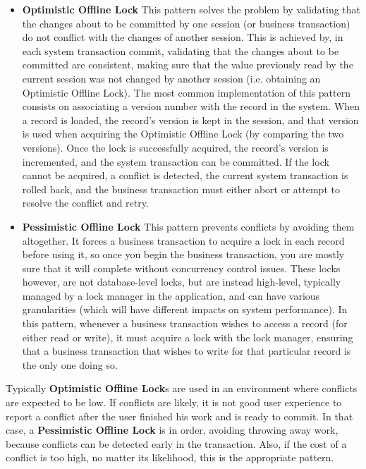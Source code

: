 \documentclass{llncs}
\begin{document}
\begin{itemize}
\item {\bf Optimistic Offline Lock} This pattern solves the problem by
  validating that the changes about to be committed by one session (or
  business transaction) do not conflict with the changes of another
  session. This is achieved by, in each system transaction commit,
  validating that the changes about to be committed are consistent,
  making sure that the value previously read by the current session
  was not changed by another session (i.e. obtaining an Optimistic
  Offline Lock).  The most common implementation of this pattern
  consists on associating a version number with the record in the
  system. When a record is loaded, the record's version is kept in the
  session, and that version is used when acquiring the Optimistic
  Offline Lock (by comparing the two versions). Once the lock is
  successfully acquired, the record's version is incremented, and the
  system transaction can be committed. If the lock cannot be acquired,
  a conflict is detected, the current system transaction is rolled
  back, and the business transaction must either abort or attempt to
  resolve the conflict and retry.

\item {\bf Pessimistic Offline Lock} This pattern prevents conflicts
  by avoiding them altogether. It forces a business transaction to
  acquire a lock in each record before using it, so once you begin the
  business transaction, you are mostly sure that it will complete
  without concurrency control issues. These locks however, are not
  database-level locks, but are instead high-level, typically managed
  by a lock manager in the application, and can have various
  granularities (which will have different impacts on system
  performance). In this pattern, whenever a business transaction
  wishes to access a record (for either read or write), it must
  acquire a lock with the lock manager, ensuring that a business
  transaction that wishes to write for that particular record is the
  only one doing so.
\end{itemize}

Typically {\bf Optimistic Offline Lock}s are used in an environment
where conflicts are expected to be low. If conflicts are likely, it is
not good user experience to report a conflict after the user finished
his work and is ready to commit. In that case, a {\bf Pessimistic
  Offline Lock} is in order, avoiding throwing away work, because
conflicts can be detected early in the transaction. Also, if the cost
of a conflict is too high, no matter its likelihood, this is the
appropriate pattern.
\end{document}
